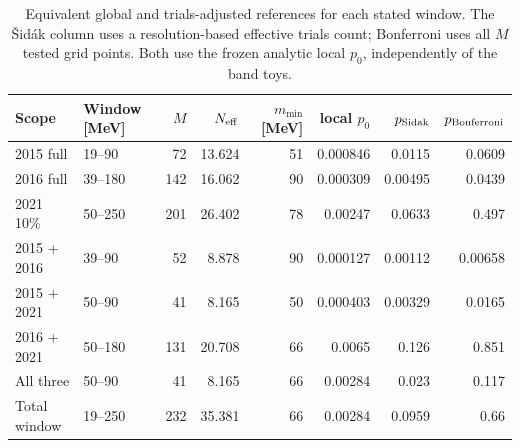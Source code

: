 \begin{table}[htbp]
\centering\scriptsize
\setlength{\tabcolsep}{4pt}
\begin{tabular}{llrrrrrr}
\toprule
Scope & Window [MeV] & $M$ & $N_{\rm eff}$ & $m_{\min}$ [MeV] & local $p_0$ & $p_{\rm Sidak}$ & $p_{\rm Bonferroni}$ \\
\midrule
2015 full & 19--90 & 72 & 13.624 & 51 & \num{0.000846} & \num{0.0115} & \num{0.0609} \\
2016 full & 39--180 & 142 & 16.062 & 90 & \num{0.000309} & \num{0.00495} & \num{0.0439} \\
2021 10\% & 50--250 & 201 & 26.402 & 78 & \num{0.00247} & \num{0.0633} & \num{0.497} \\
2015 + 2016 & 39--90 & 52 & 8.878 & 90 & \num{0.000127} & \num{0.00112} & \num{0.00658} \\
2015 + 2021 & 50--90 & 41 & 8.165 & 50 & \num{0.000403} & \num{0.00329} & \num{0.0165} \\
2016 + 2021 & 50--180 & 131 & 20.708 & 66 & \num{0.0065} & \num{0.126} & \num{0.851} \\
All three & 50--90 & 41 & 8.165 & 66 & \num{0.00284} & \num{0.023} & \num{0.117} \\
Total window & 19--250 & 232 & 35.381 & 66 & \num{0.00284} & \num{0.0959} & \num{0.66} \\
\bottomrule\end{tabular}
\caption{Equivalent global and trials-adjusted references for each stated window. The \v{S}id\'ak column uses a resolution-based effective trials count; Bonferroni uses all $M$ tested grid points. Both use the frozen analytic local $p_0$, independently of the \StageToys{} band toys.}
\label{tab:global-summary}\end{table}
